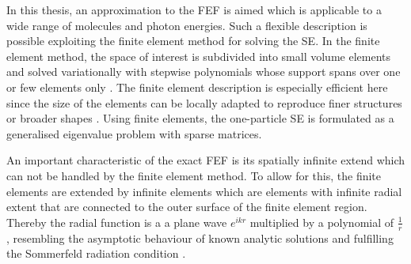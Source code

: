 In this thesis, an approximation to the FEF is aimed which is applicable to a wide range of molecules and photon energies.
Such a flexible description is possible exploiting the finite element method for solving the SE.
In the finite element method, the space of interest is subdivided into small volume elements and solved variationally with stepwise polynomials whose support spans over one or few elements only \cite{femBraess,femGilbarg}.
The finite element description is especially efficient here since the size of the elements can be locally adapted to reproduce finer structures or broader shapes \cite{femBraess,femCiarlet}.
Using finite elements, the one-particle SE is formulated as a generalised eigenvalue problem with sparse matrices.

An important characteristic of the exact FEF is its spatially infinite extend which can not be handled by the finite element method.
To allow for this, the finite elements are extended by infinite elements \cite{astley3, astley2, Astley,dreyer} which are elements with infinite radial extent that are connected to the outer surface of the finite element region.
Thereby the radial function is a a plane wave $e^{ikr}$ multiplied by a polynomial of $\frac 1r$, resembling the asymptotic behaviour of known analytic solutions and fulfilling the Sommerfeld radiation condition \cite{sommerfeldCond}.


